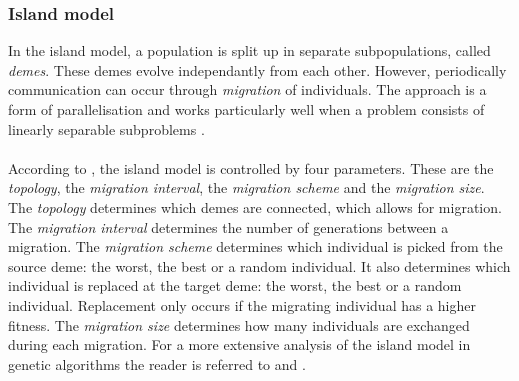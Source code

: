 \subsubsection{Island model}
In the island model, a population is split up in separate subpopulations,
called \emph{demes}. These demes evolve independantly from each other.
However, periodically communication can occur through \emph{migration} of
individuals. The approach is a form of parallelisation and works particularly
well when a problem consists of linearly separable subproblems
\citep{Whitley1999}.\\\\
\noindent
According to \citep{Nowostawski1999}, the island model is controlled by
four parameters. These are the \emph{topology}, the \emph{migration interval}, the
\emph{migration scheme} and the \emph{migration size}. The \emph{topology}
determines which demes are connected, which allows for migration. The
\emph{migration interval} determines the number of generations between a
migration. The \emph{migration scheme} determines which individual is picked
from the source deme: the worst, the best or a random individual. It also
determines which individual is replaced at the target deme: the worst, the best
or a random individual. Replacement only occurs if the migrating individual has a higher fitness. The \emph{migration size} determines how many individuals are
exchanged during each migration. For a more extensive analysis of the island model in genetic algorithms the reader is referred to \citep{Martin1997} and \citep{Whitley1999}.

